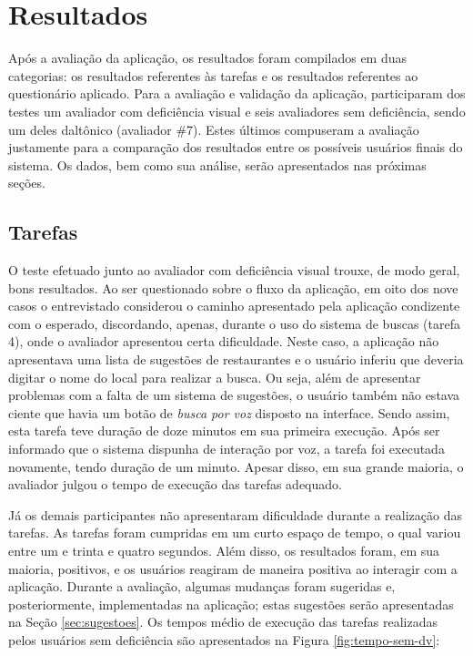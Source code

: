 \chapter{\label{chap:resultados}Resultados}

Após a avaliação da aplicação, os resultados foram compilados em duas categorias: os resultados referentes às tarefas e os resultados referentes ao questionário aplicado. Para a avaliação e validação da aplicação, participaram dos testes um avaliador com deficiência visual e seis avaliadores sem deficiência, sendo um deles daltônico (avaliador \#7). Estes últimos compuseram a avaliação justamente para a comparação dos resultados entre os possíveis usuários finais do sistema. Os dados, bem como sua análise, serão apresentados nas próximas seções.

\section{Tarefas}

O teste efetuado junto ao avaliador com deficiência visual trouxe, de modo geral, bons resultados. Ao ser questionado sobre o fluxo da aplicação, em oito dos nove casos o entrevistado considerou o caminho apresentado pela aplicação condizente com o esperado, discordando, apenas, durante o uso do sistema de buscas (tarefa 4), onde o avaliador apresentou certa dificuldade. Neste caso, a aplicação não apresentava uma lista de sugestões de restaurantes e o usuário inferiu que deveria digitar o nome do local para realizar a busca. Ou seja, além de apresentar problemas com a falta de um sistema de sugestões, o usuário também não estava ciente que havia um botão de \emph{busca por voz} disposto na interface. Sendo assim, esta tarefa teve duração de doze minutos em sua primeira execução. Após ser informado que o sistema dispunha de interação por voz, a tarefa foi executada novamente, tendo duração de um minuto. Apesar disso, em sua grande maioria, o avaliador julgou o tempo de execução das tarefas adequado.

Já os demais participantes não apresentaram dificuldade durante a realização das tarefas. As tarefas foram cumpridas em um curto espaço de tempo, o qual variou entre um e trinta e quatro segundos. Além disso, os resultados foram, em sua maioria, positivos, e os usuários reagiram de maneira positiva ao interagir com a aplicação. Durante a avaliação, algumas mudanças foram sugeridas e, posteriormente, implementadas na aplicação; estas sugestões serão apresentadas na Seção \ref{sec:sugestoes}. Os tempos médio de execução das tarefas realizadas pelos usuários sem deficiência são apresentados na Figura \ref{fig:tempo-sem-dv}:

